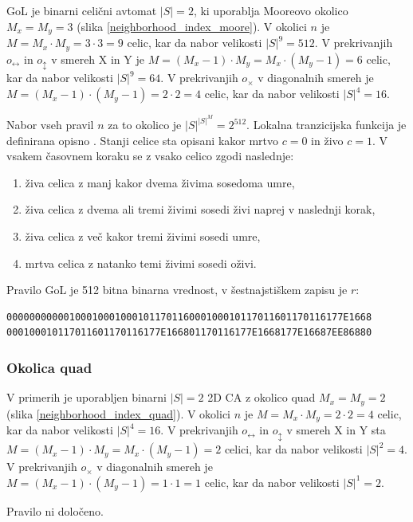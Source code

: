 \documentclass[12pt,a4paper,openany,twoside]{book}
\begin{document}
GoL je binarni celični avtomat \(|S|=2\), ki uporablja Mooreovo okolico \(M_x=M_y=3\) (slika \ref{neighborhood_index_moore}).
V okolici \(n\) je \(M=M_x \cdot M_y=3 \cdot 3=9\) celic, kar da nabor velikosti \(|S|^9=512\).
V prekrivanjih \(o_{\leftrightarrow}\) in \(o_{\updownarrow}\) v smereh X in Y
je \(M=(M_x-1) \cdot M_y=M_x \cdot (M_y-1)=6\) celic, kar da nabor velikosti \(|S|^9=64\).
V prekrivanjih \(o_{\times}\) v diagonalnih smereh
je \(M=(M_x-1) \cdot (M_y-1)=2 \cdot 2=4\) celic, kar da nabor velikosti \(|S|^4=16\).

Nabor vseh pravil \(n\) za to okolico je \(|S|^{|S|^{M}}=2^{512}\).
Lokalna tranzicijska funkcija je definirana opisno \cite{WikiGoL}.
Stanji celice sta opisani kakor mrtvo \(c=0\) in živo \(c=1\).
V vsakem časovnem koraku se z vsako celico zgodi naslednje:
\begin{enumerate}
\item živa celica z manj kakor dvema živima sosedoma umre,
\item živa celica z dvema ali tremi živimi sosedi živi naprej v naslednji korak,
\item živa celica z več kakor tremi živimi sosedi umre,
\item mrtva celica z natanko temi živimi sosedi oživi.
\end{enumerate}
Pravilo GoL je 512 bitna binarna vrednost, v šestnajstiškem zapisu je \(r\):
\begin{verbatim}
00000000000100010001000101170116000100010117011601170116177E1668
000100010117011601170116177E166801170116177E1668177E16687EE86880
\end{verbatim}

\subsubsection{Okolica quad}

V primerih je uporabljen binarni \(|S|=2\) 2D CA z okolico quad \(M_x=M_y=2\) (slika \ref{neighborhood_index_quad}).
V okolici \(n\) je \(M=M_x \cdot M_y=2 \cdot 2=4\) celic, kar da nabor velikosti \(|S|^4=16\).
V prekrivanjih \(o_{\leftrightarrow}\) in \(o_{\updownarrow}\) v smereh X in Y
sta \(M=(M_x-1) \cdot M_y=M_x \cdot (M_y-1)=2\) celici, kar da nabor velikosti \(|S|^2=4\).
V prekrivanjih \(o_{\times}\) v diagonalnih smereh
je \(M=(M_x-1) \cdot (M_y-1)=1 \cdot 1=1\) celic, kar da nabor velikosti \(|S|^1=2\).

Pravilo ni določeno.
\end{document}
